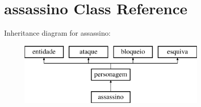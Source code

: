 \hypertarget{classassassino}{}\section{assassino Class Reference}
\label{classassassino}
Inheritance diagram for assassino\+:\begin{figure}[H]
\begin{center}
\leavevmode
\includegraphics[height=3.000000cm]{classassassino}
\end{center}
\end{figure}
